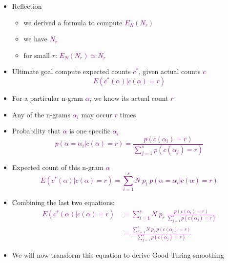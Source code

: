 \documentclass[landscape]{slides}
\newcommand{\maths}[1]{\textcolor{purple}{#1}}
\begin{document}
\begin{itemize}
\item Reflection
\begin{itemize}
\item we derived a formula to compute \maths{$E_N(N_r)$}
\item we have \maths{$N_r$}
\item for small $r$: \maths{$E_N(N_r) \simeq N_r$}
\end{itemize}
\item Ultimate goal compute expected counts \maths{$c^*$}, given actual counts \maths{$c$}
\maths{\begin{equation*}
E(c^*(\alpha)|c(\alpha)=r)
\end{equation*}}
\end{itemize}


\begin{itemize}
\item For a particular n-gram \maths{$\alpha$}, we know its actual count \maths{$r$}
\item Any of the n-grams \maths{$\alpha_i$} may occur \maths{$r$} times
\item Probability that \maths{$\alpha$} is one specific \maths{$\alpha_i$}
\maths{\begin{equation*}
p(\alpha=\alpha_i|c(\alpha)=r) = \frac{p(c(\alpha_i)=r)}{\sum_{j=1}^s p(c(\alpha_j)=r)}
\end{equation*}}
\vspace{-12mm}
\item Expected count of this n-gram \maths{$\alpha$}
\maths{\begin{equation*}
E(c^*(\alpha)|c(\alpha)=r) = \sum_{i=1}^s N \; p_i \; p(\alpha=\alpha_i|c(\alpha)=r)
\end{equation*}}
\end{itemize}


\vspace{15mm}
\begin{itemize}
\item Combining the last two equations:
\maths{\begin{equation*}
\begin{split}
E(c^*(\alpha)|c(\alpha)=r) \; &= \sum_{i=1}^s N \; p_i \; \frac{p(c(\alpha_i)=r)}{\sum_{j=1}^s p(c(\alpha_j)=r)}\\
&= \frac{\sum_{i=1}^s N \; p_i \; p(c(\alpha_i)=r)}{\sum_{j=1}^s p(c(\alpha_j)=r)}
\end{split}
\end{equation*}}
\item We will now transform this equation to derive Good-Turing smoothing
\end{itemize}
\end{document}
